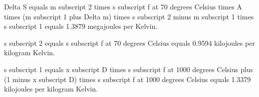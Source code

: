 Delta S equals m subscript 2 times s subscript f at 70 degrees Celsius times A times (m subscript 1 plus Delta m) times s subscript 2 minus m subscript 1 times s subscript 1 equals 1.3879 megajoules per Kelvin.

s subscript 2 equals s subscript f at 70 degrees Celsius equals 0.9594 kilojoules per kilogram Kelvin.

s subscript 1 equals x subscript D times s subscript f at 1000 degrees Celsius plus (1 minus x subscript D) times s subscript f at 1000 degrees Celsius equals 1.3379 kilojoules per kilogram Kelvin.
